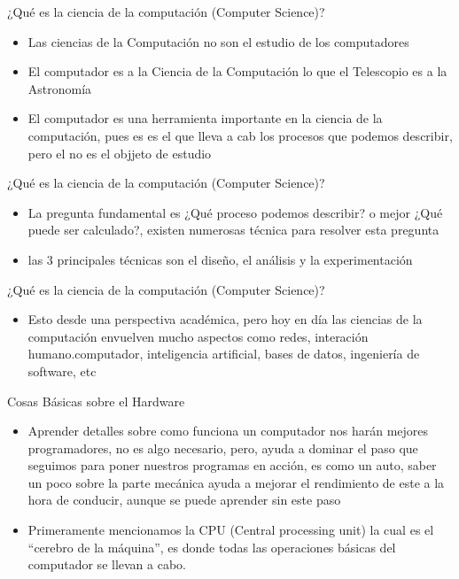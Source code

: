 \documentclass[ignorenonframetext,]{beamer}
\providecommand{\tightlist}{%
  \setlength{\itemsep}{0pt}\setlength{\parskip}{0pt}}
\begin{document}
\begin{frame}{¿Qué es la ciencia de la computación (Computer Science)?}

\begin{itemize}
\item
  Las ciencias de la Computación no son el estudio de los computadores
\item
  El computador es a la Ciencia de la Computación lo que el Telescopio
  es a la Astronomía
\item
  El computador es una herramienta importante en la ciencia de la
  computación, pues es es el que lleva a cab los procesos que podemos
  describir, pero el no es el objjeto de estudio
\end{itemize}

\end{frame}

\begin{frame}{¿Qué es la ciencia de la computación (Computer Science)?}

\begin{itemize}
\item
  La pregunta fundamental es ¿Qué proceso podemos describir? o mejor
  ¿Qué puede ser calculado?, existen numerosas técnica para resolver
  esta pregunta
\item
  las 3 principales técnicas son el diseño, el análisis y la
  experimentación
\end{itemize}

\end{frame}

\begin{frame}{¿Qué es la ciencia de la computación (Computer Science)?}

\begin{itemize}
\tightlist
\item
  Esto desde una perspectiva académica, pero hoy en día las ciencias de
  la computación envuelven mucho aspectos como redes, interación
  humano.computador, inteligencia artificial, bases de datos, ingeniería
  de software, etc
\end{itemize}

\end{frame}

\begin{frame}{Cosas Básicas sobre el Hardware}

\begin{itemize}
\item
  Aprender detalles sobre como funciona un computador nos harán mejores
  programadores, no es algo necesario, pero, ayuda a dominar el paso que
  seguimos para poner nuestros programas en acción, es como un auto,
  saber un poco sobre la parte mecánica ayuda a mejorar el rendimiento
  de este a la hora de conducir, aunque se puede aprender sin este paso
\item
  Primeramente mencionamos la CPU (Central processing unit) la cual es
  el ``cerebro de la máquina'', es donde todas las operaciones básicas
  del computador se llevan a cabo.
\end{itemize}

\end{frame}
\end{document}
